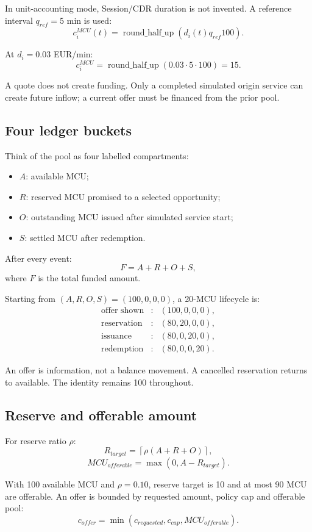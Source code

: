 \documentclass[11pt,a4paper]{article}
\begin{document}
In unit-accounting mode, Session/CDR duration is not invented. A reference interval $q_{ref}=5$ min is used:
\[
c_i^{MCU}(t)=\operatorname{round\_half\_up}
\left(d_i(t)q_{ref}100\right).
\]

At $d_i=0.03$ EUR/min:
\[
c_i^{MCU}=\operatorname{round\_half\_up}(0.03\cdot5\cdot100)=15.
\]

A quote does not create funding. Only a completed simulated origin service can create future inflow; a current offer must be financed from the prior pool.

\subsection{Four ledger buckets}

Think of the pool as four labelled compartments:
\begin{itemize}
\item $A$: available MCU;
\item $R$: reserved MCU promised to a selected opportunity;
\item $O$: outstanding MCU issued after simulated service start;
\item $S$: settled MCU after redemption.
\end{itemize}

After every event:
\[
\boxed{F=A+R+O+S},
\]
where $F$ is the total funded amount.

Starting from $(A,R,O,S)=(100,0,0,0)$, a 20-MCU lifecycle is:
\[
\begin{array}{rcl}
\text{offer shown} &: &(100,0,0,0),\\
\text{reservation} &: &(80,20,0,0),\\
\text{issuance} &: &(80,0,20,0),\\
\text{redemption} &: &(80,0,0,20).
\end{array}
\]

An offer is information, not a balance movement. A cancelled reservation returns to available. The identity remains 100 throughout.

\subsection{Reserve and offerable amount}

For reserve ratio $\rho$:
\[
R_{target}=\left\lceil\rho(A+R+O)\right\rceil,
\]
\[
MCU_{offerable}=\max(0,A-R_{target}).
\]

With 100 available MCU and $\rho=0.10$, reserve target is 10 and at most 90 MCU are offerable. An offer is bounded by requested amount, policy cap and offerable pool:
\[
c_{offer}=\min(c_{requested},c_{cap},MCU_{offerable}).
\]
\end{document}
